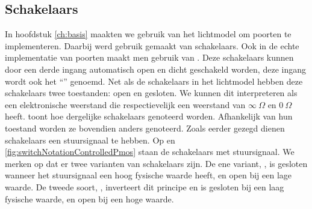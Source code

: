 \subsection{Schakelaars}
In hoofdstuk \ref{ch:basis} maakten we gebruik van het lichtmodel om poorten te implementeren. Daarbij werd gebruik gemaakt van schakelaars. Ook in de echte implementatie van poorten maakt men gebruik van . Deze schakelaars kunnen door een derde ingang automatisch open en dicht geschakeld worden, deze ingang wordt ook het ``'' genoemd. Net als de schakelaars in het lichtmodel hebben deze schakelaars twee toestanden: open en gesloten. We kunnen dit interpreteren als een elektronische weerstand die respectievelijk een weerstand van $\infty\ \Omega$ en $0\ \Omega$ heeft.  toont hoe dergelijke schakelaars genoteerd worden. Afhankelijk van hun toestand worden ze bovendien anders genoteerd. Zoals eerder gezegd dienen schakelaars een stuursignaal te hebben. Op  en \ref{fig:switchNotationControlledPmos} staan de schakelaars met stuursignaal. We merken op dat er twee varianten van schakelaars zijn. De ene variant, , is gesloten wanneer het stuursignaal een hoog fysische waarde heeft, en open bij een lage waarde. De tweede soort, , inverteert dit principe en is gesloten bij een laag fysische waarde, en open bij een hoge waarde.

